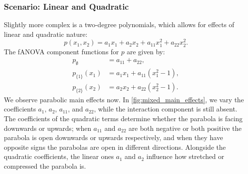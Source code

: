 \subsubsection{Scenario: Linear and Quadratic}
Slightly more complex is a two-degree polynomials, which allows for effects of linear and quadratic nature:
\[
p(x_1, x_2) = a_1 x_1 + a_2 x_2 + a_{11} x_1^2 + a_{22} x_2^2.
\]
The fANOVA component functions for $p$ are given by:
\begin{align*}
    p_{\emptyset} &= a_{11} + a_{22}, \\
    p_{\{1\}}(x_1) &= a_1 x_1 + a_{11}(x_1^2 - 1), \\
    p_{\{2\}}(x_2) &= a_2 x_2 + a_{22}(x_2^2 - 1).
\end{align*}
We observe parabolic main effects now. In \autoref{fig:mixed_main_effects}, we vary the coefficients $a_1$, $a_2$, $a_{11}$, and $a_{22}$, while the interaction component is still absent.
The coefficients of the quadratic terms determine whether the parabola is facing downwards or upwards; when $a_{11}$ and $a_{22}$ are both negative or both positive the parabola is open downwards or upwards respectively, and when they have opposite signs the parabolas are open in different directions. Alongside the quadratic coefficients, the linear ones $a_1$ and $a_2$ influence how stretched or compressed the parabola is.

